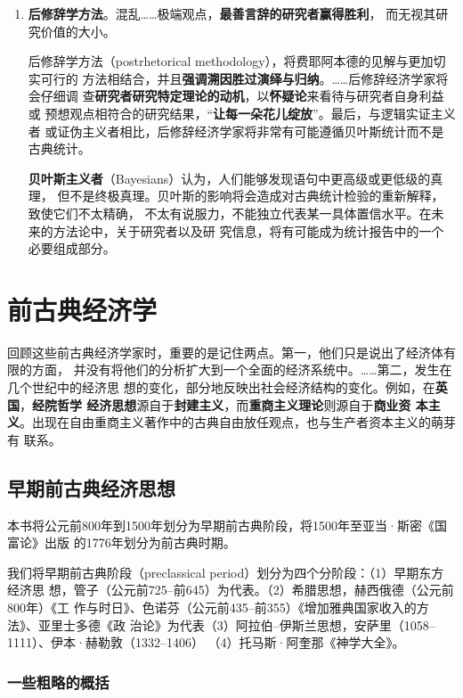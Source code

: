 \begin{enumerate}
\item \textbf{后修辞学方法}。混乱……极端观点，\textbf{最善言辞的研究者赢得胜利}，
  而无视其研究价值的大小。

  后修辞学方法（postrhetorical methodology），将费耶阿本德的见解与更加切实可行的
  方法相结合，并且\textbf{强调溯因胜过演绎与归纳}。……后修辞经济学家将会仔细调
  查\textbf{研究者研究特定理论的动机}，以\textbf{怀疑论}来看待与研究者自身利益或
  预想观点相符合的研究结果，“\textbf{让每一朵花儿绽放}”。最后，与逻辑实证主义者
  或证伪主义者相比，后修辞经济学家将非常有可能遵循贝叶斯统计而不是古典统计。

  \textbf{贝叶斯主义者}（Bayesians）认为，人们能够发现语句中更高级或更低级的真理，
  但不是终极真理。贝叶斯的影响将会造成对古典统计检验的重新解释，致使它们不太精确，
  不太有说服力，不能独立代表某一具体置信水平。在未来的方法论中，关于研究者以及研
  究信息，将有可能成为统计报告中的一个必要组成部分。

\end{enumerate}

\part{前古典经济学}

回顾这些前古典经济学家时，重要的是记住两点。第一，他们只是说出了经济体有限的方面，
并没有将他们的分析扩大到一个全面的经济系统中。……第二，发生在几个世纪中的经济思
想的变化，部分地反映出社会经济结构的变化。例如，在\textbf{英国}，\textbf{经院哲学
  经济思想}源自于\textbf{封建主义}，而\textbf{重商主义理论}则源自于\textbf{商业资
  本主义}。出现在自由重商主义著作中的古典自由放任观点，也与生产者资本主义的萌芽有
联系。

\chapter{早期前古典经济思想}

本书将公元前800年到1500年划分为早期前古典阶段，将1500年至亚当·斯密《国富论》出版
的1776年划分为前古典时期。

我们将早期前古典阶段（preclassical period）划分为四个分阶段：（1）早期东方经济思
想，管子（公元前725--前645）为代表。（2）希腊思想，赫西俄德（公元前800年）《工
作与时日》、色诺芬（公元前435--前355）《增加雅典国家收入的方法》、亚里士多德《政
治论》为代表（3）阿拉伯--伊斯兰思想，安萨里（1058--1111）、伊本·赫勒敦（1332--1406）
（4）托马斯·阿奎那《神学大全》。

\section{一些粗略的概括}

